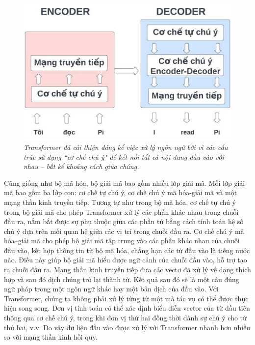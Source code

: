 \begin{multicols}{2}
	\begin{figure}[H]
		\vspace*{-5pt}
		\centering
		\captionsetup{labelformat= empty, justification=centering}
		\includegraphics[width= 1\linewidth]{Transformer.jpeg}
		\caption{\small\textit{\color{timhieukhoahoc}Transformer đã cải thiện đáng kể việc xử lý ngôn ngữ bởi vì các cấu trúc sử dụng ``cơ chế chú ý" để kết nối tất cả nội dung đầu vào với nhau – bất kể khoảng cách giữa chúng.}}
		\vspace*{-10pt}
	\end{figure}
	Cũng giống như bộ mã hóa, bộ giải mã bao gồm nhiều lớp giải mã. Mỗi lớp giải mã bao gồm ba lớp con: cơ chế tự chú ý, cơ chế chú ý mã hóa-giải mã và một mạng thần kinh truyền tiếp. Tương tự như trong bộ mã hóa, cơ chế tự chú ý trong bộ giải mã cho phép Transformer xử lý các phần khác nhau trong chuỗi đầu ra, nắm bắt được sự phụ thuộc giữa các phần tử bằng cách tính toán hệ số chú ý dựa trên mối quan hệ giữa các vị trí trong chuỗi đầu ra. Cơ chế chú ý mã hóa--giải mã cho phép bộ giải mã tập trung vào các phần khác nhau của chuỗi đầu vào, kết hợp thông tin từ bộ mã hóa, chẳng hạn các từ đầu vào là tiếng nước nào. Điều này giúp bộ giải mã hiểu được ngữ cảnh của chuỗi đầu vào, hỗ trợ tạo ra chuỗi đầu ra. Mạng thần kinh truyền tiếp đưa các vectơ đã xử lý về dạng thích hợp và sau đó dịch chúng trở lại thành từ. Kết quả sau đó sẽ là một câu đúng ngữ pháp trong một ngôn ngữ khác hay một bản dịch của đầu vào.
	\vskip 0.1cm
	Với Transformer, chúng ta không phải xử lý từng từ một mà tác vụ có thể được thực hiện song song. Đơn vị tính toán có thể xác định biểu diễn vector của từ đầu tiên thông qua cơ chế chú ý, trong khi đơn vị thứ hai đồng thời dành sự chú ý cho từ thứ hai, v.v. Do vậy dữ liệu đầu vào được xử lý với Transformer nhanh hơn nhiều so với mạng thần kinh hồi quy.

\end{multicols}
